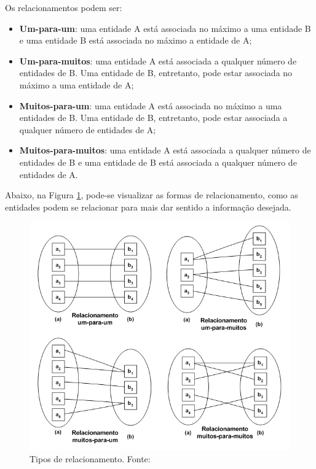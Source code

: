 Os relacionamentos podem ser: 

\begin{itemize}
	\item \textbf{Um-para-um}: uma entidade A está associada no máximo a uma entidade B e uma entidade B está associada no máximo a entidade de A;
	\item \textbf{Um-para-muitos}: uma entidade A está associada a qualquer número de entidades de B. Uma entidade de B, entretanto, pode estar associada no máximo a uma entidade de A;
	\item \textbf{Muitos-para-um}: uma entidade A está associada no máximo a uma entidades de B. Uma entidade de B, entretanto, pode estar associada a qualquer número de entidades de A;
	\item \textbf{Muitos-para-muitos}: uma entidade A está associada a qualquer número de entidades de B e uma entidade de B está associada a qualquer número de entidades de A.
\end{itemize}

Abaixo, na Figura \ref{fig:tipos-de-relacionamento}, pode-se visualizar as formas de relacionamento, como as entidades podem se relacionar para mais dar sentido a informação desejada.

\begin{figure}[H]
	\centering
	\includegraphics[scale=0.6]{imagens/relacionamentos-2.png}
	\caption{Tipos de relacionamento. Fonte: \cite{fundamentos2005Sanches}}
	\label{fig:tipos-de-relacionamento}
\end{figure}

